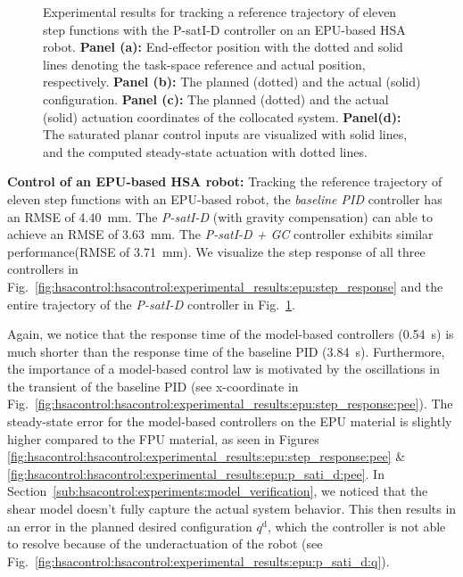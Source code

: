 \begin{figure}[ht]
    \caption{Experimental results for tracking a reference trajectory of eleven step functions with the P-satI-D controller on an EPU-based HSA robot. \textbf{Panel (a):} End-effector position with the dotted and solid lines denoting the task-space reference and actual position, respectively.
    \textbf{Panel (b):} The planned (dotted) and the actual (solid) configuration. 
    \textbf{Panel (c):} The planned (dotted) and the actual (solid) actuation coordinates of the collocated system. 
    \textbf{Panel(d):} The saturated planar control inputs are visualized with solid lines, and the computed steady-state actuation with dotted lines.}\label{fig:hsacontrol:hsacontrol:experimental_results:epu:p_sati_d}
\end{figure}

\noindent \textbf{Control of an EPU-based HSA robot:}
Tracking the reference trajectory of eleven step functions with an EPU-based robot, the \emph{baseline PID} controller has an \gls{RMSE} of \SI{4.40}{mm}. The \emph{P-satI-D} (with gravity compensation) can able to achieve an \gls{RMSE} of \SI{3.63}{mm}. The \emph{P-satI-D + GC} controller exhibits similar performance(\gls{RMSE} of \SI{3.71}{mm}).
We visualize the step response of all three controllers in Fig.~\ref{fig:hsacontrol:hsacontrol:experimental_results:epu:step_response} and the entire trajectory of the \emph{P-satI-D} controller in Fig.~\ref{fig:hsacontrol:hsacontrol:experimental_results:epu:p_sati_d}.

Again, we notice that the response time of the model-based controllers (\SI{0.54}{s}) is much shorter than the response time of the baseline PID (\SI{3.84}{s}). Furthermore, the importance of a model-based control law is motivated by the oscillations in the transient of the baseline PID (see x-coordinate in Fig.~\ref{fig:hsacontrol:hsacontrol:experimental_results:epu:step_response:pee}).
The steady-state error for the model-based controllers on the EPU material is slightly higher compared to the FPU material, as seen in Figures \ref{fig:hsacontrol:hsacontrol:experimental_results:epu:step_response:pee} \& \ref{fig:hsacontrol:hsacontrol:experimental_results:epu:p_sati_d:pee}. In Section~\ref{sub:hsacontrol:experiments:model_verification}, we noticed that the shear model doesn't fully capture the actual system behavior. This then results in an error in the planned desired configuration $q^\mathrm{d}$, which the controller is not able to resolve because of the underactuation of the robot (see Fig.~\ref{fig:hsacontrol:hsacontrol:experimental_results:epu:p_sati_d:q}).
